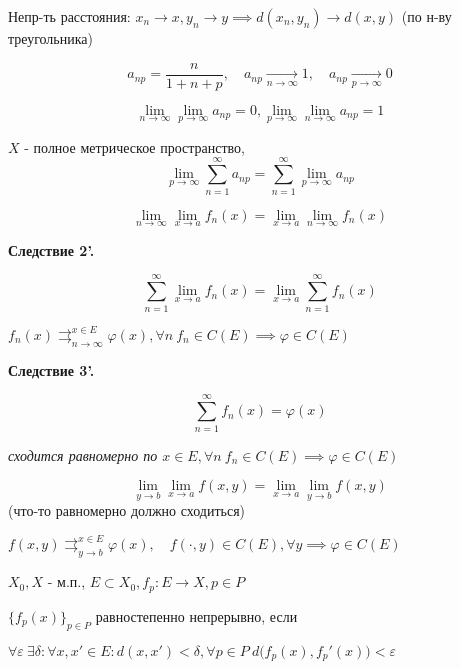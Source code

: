   \par $ $

  Непр-ть расстояния: $x_n \to x, y_n \to y \implies d(x_n, y_n) \to d(x, y)$ (по н-ву треугольника)

  \begin{illustration}
    $$a_{np} = \frac{n}{1 + n + p},\quad a_{np} \underset{n \to \infty}{\longrightarrow} 1, \quad a_{np} \underset{p\to\infty}{\longrightarrow} 0$$

    $$\lim_{n\to\infty}\lim_{p\to\infty} a_{np} = 0, \lim_{p\to\infty}\lim_{n\to\infty}a_{np} = 1$$
  \end{illustration}

  \begin{corollary} %
    $X$ - полное метрическое пространство,
    $$\lim_{p\to\infty} \sum^\infty_{n=1} a_{np} = \sum^\infty_{n=1} \lim_{p\to\infty}a_{np}$$
  \end{corollary}

  \begin{corollary}
    $$\lim_{n\to\infty}\lim_{x\to a}f_n(x) = \lim_{x\to a}\lim_{n\to\infty} f_n(x)$$
  \end{corollary}

  {\noindent \textbf{Следствие 2'.}}

  $$\sum_{n=1}^\infty \lim_{x\to a}f_n(x) = \lim_{x \to a}\sum^\infty_{n=1} f_n(x)$$

  \begin{corollary} %
    $f_n(x) \rightrightarrows^{x\in E}_{n \to \infty} \varphi(x), \forall n \ f_n \in C(E) \implies \varphi \in C(E)$
  \end{corollary}

  {\noindent \textbf{Следствие 3'.}}

  $$\sum^{\infty}_{n=1}f_n(x) = \varphi(x)$$

  \textit{сходится равномерно по $x \in E, \forall n \ f_n \in C(E) \implies \varphi \in C(E)$}

  \begin{corollary}
    $$\lim_{y\to b}\lim_{x \to a} f(x,y) = \lim_{x \to a}\lim_{y \to b} f(x,y)$$ (что-то равномерно должно сходиться)
  \end{corollary}

  \begin{corollary}  %
    $f(x,y) \rightrightarrows_{y\to b}^{x\in E} \varphi(x),\quad f(\cdot, y) \in C(E), \forall y \implies \varphi \in C(E)$
  \end{corollary}

  \begin{definition}
    $X_0,X$ - м.п., $E\subset X_0, f_p: E \to X, p \in P$

    $\{f_p(x)\}_{p\in P}$ равностепенно непрерывно, если 

    $\forall \varepsilon \ \exists \delta: \forall x, x' \in E: d(x, x') < \delta, \forall p \in P \ d\big(f_p(x), f_p'(x)\big) < \varepsilon$
  \end{definition}

